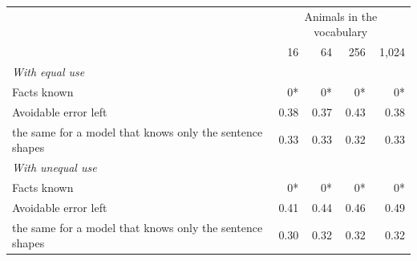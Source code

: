\begin{tabular}{@{}lrrrr@{}}
\toprule
 & \multicolumn{4}{c}{Animals in the vocabulary} \\
 & 16 & 64 & 256 & 1{,}024 \\
\midrule
\emph{With equal use} & & & & \\
Facts known & 0* & 0* & 0* & 0* \\
Avoidable error left & 0.38 & 0.37 & 0.43 & 0.38 \\
\quad the same for a model that knows only the sentence shapes & 0.33 & 0.33 & 0.32 & 0.33 \\
\emph{With unequal use} & & & & \\
Facts known & 0* & 0* & 0* & 0* \\
Avoidable error left & 0.41 & 0.44 & 0.46 & 0.49 \\
\quad the same for a model that knows only the sentence shapes & 0.30 & 0.32 & 0.32 & 0.32 \\
\bottomrule
\end{tabular}
